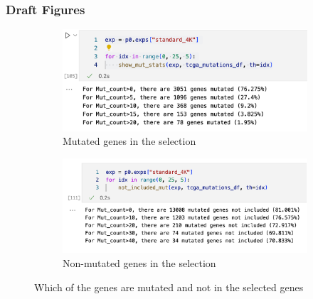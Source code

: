 \subsubsection{Draft Figures}

\begin{figure}
    \captionsetup[subfigure]{justification=Centering}
    \begin{subfigure}[t]{0.75\textwidth}
        \includegraphics[width=\textwidth]{Sections/Network_I/Resources/Gene_selection/included_mut.png}
        \caption{Mutated genes in the selection}
    \end{subfigure}\hspace{\fill} %

    \bigskip %
    \begin{subfigure}[t]{0.75\textwidth}
        \includegraphics[width=\linewidth]{Sections/Network_I/Resources/Gene_selection/not_included_mut.png}
        \caption{Non-mutated genes in the selection}
    \end{subfigure}\hspace{\fill} %

    \caption{Which of the genes are mutated and not in the selected genes}
    \label{fig:N_I:gene_sel}
\end{figure}
